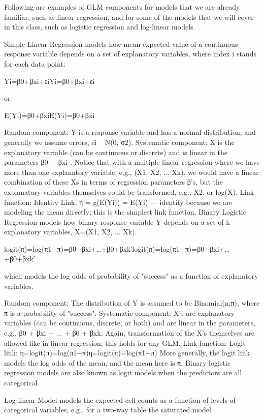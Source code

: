 Following are examples of GLM components for models that we are already familiar, such as linear regression, and for some of the models that we will cover in this class, such as logistic regression and log-linear models.

Simple Linear Regression models how mean expected value of a continuous response variable depends on a set of explanatory variables, where index i stands for each data point:

Yi=β0+βxi+ϵiYi=β0+βxi+ϵi

or

E(Yi)=β0+βxiE(Yi)=β0+βxi 

Random component: Y is a response variable and has a normal distribution, and generally we assume errors, ei ~ N(0, σ2).
Systematic component: X is the explanatory variable (can be continuous or discrete) and is linear in the parameters β0  + βxi . Notice that with a multiple linear regression where we have more than one explanatory variable, e.g., (X1, X2, ... Xk), we would have a linear combination of these Xs in terms of regression parameters β's, but the explanatory variables themselves could be transformed, e.g., X2, or log(X). 
Link function: Identity Link, η = g(E(Yi)) = E(Yi) --- identity because we are modeling the mean directly; this is the simplest link function.
Binary Logistic Regression models how binary response variable Y depends on a set of k explanatory variables, X=(X1, X2, ... Xk). 

logit(π)=log(π1−π)=β0+βxi+…+β0+βxk′logit(π)=log(π1−π)=β0+βxi+…+β0+βxk′

which models the log odds of probability of "success" as a function of explanatory variables.

Random component: The distribution of Y is assumed to be Binomial(n,π), where π is a probability of "success". 
Systematic component: X's are explanatory variables (can be continuous, discrete, or both) and are linear in the parameters, e.g.,  β0 + βxi + ... + β0 + βxk. Again, transformation of the X's themselves are allowed like in linear regression; this holds for any GLM. 
Link function: Logit link:
η=logit(π)=log(π1−π)η=logit(π)=log(π1−π)
More generally, the logit link models the log odds of the mean, and the mean here is π. Binary logistic regression models are also known as logit models when the predictors are all categorical.

Log-linear Model models the expected cell counts as a function of levels of categorical variables, e.g., for a two-way table the saturated model

